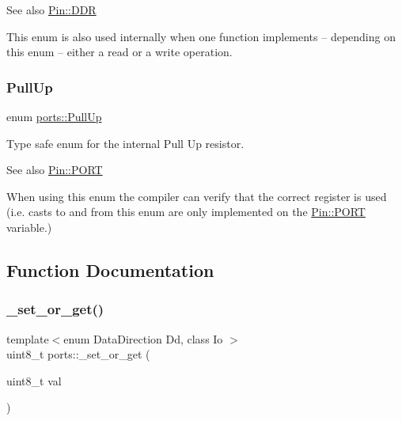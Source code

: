 \begin{DoxySeeAlso}{See also}
\hyperlink{structports_1_1Pin_aaebb4d6cb5db0635fe8e7d6e7d315c7f}{Pin\+::\+D\+DR}
\end{DoxySeeAlso}
This enum is also used internally when one function implements -- depending on this enum -- either a read or a write operation. \hypertarget{namespaceports_a49bf0ccedb4cfed89a328574e53bec07}{}\label{namespaceports_a49bf0ccedb4cfed89a328574e53bec07} 
\subsubsection{\texorpdfstring{Pull\+Up}{PullUp}}
{\footnotesize\ttfamily enum \hyperlink{namespaceports_a49bf0ccedb4cfed89a328574e53bec07}{ports\+::\+Pull\+Up}\hspace{0.3cm}{\ttfamily [strong]}}



Type safe enum for the internal Pull Up resistor. 

\begin{DoxySeeAlso}{See also}
\hyperlink{structports_1_1Pin_aaa08f0eb17ef31d9f46d65d50c8a093e}{Pin\+::\+P\+O\+RT}
\end{DoxySeeAlso}
When using this enum the compiler can verify that the correct register is used (i.\+e. casts to and from this enum are only implemented on the \hyperlink{structports_1_1Pin_aaa08f0eb17ef31d9f46d65d50c8a093e}{Pin\+::\+P\+O\+RT} variable.) 

\subsection{Function Documentation}
\hypertarget{namespaceports_aa339a9d178cb414c4cf243450d5887d2}{}\label{namespaceports_aa339a9d178cb414c4cf243450d5887d2} 
\subsubsection{\texorpdfstring{\+\_\+set\+\_\+or\+\_\+get()}{\_set\_or\_get()}}
{\footnotesize\ttfamily template$<$enum Data\+Direction Dd, class Io $>$ \\
uint8\+\_\+t ports\+::\+\_\+set\+\_\+or\+\_\+get (\begin{DoxyParamCaption}\item[{uint8\+\_\+t}]{val }\end{DoxyParamCaption})}




